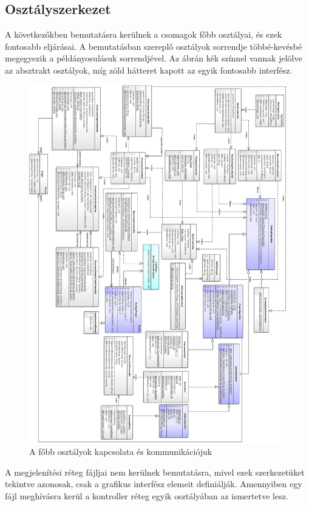 \documentclass{elteikthesis}
\begin{document}
\subsection{Osztályszerkezet}
A következőkben bemutatásra kerülnek a csomagok főbb osztályai, és ezek fontosabb eljárásai. A bemutatásban szereplő osztályok sorrendje többé-kevésbé megegyezik a példányosulásuk sorrendjével. Az ábrán kék színnel vannak jelölve az absztrakt osztályok, míg zöld hátteret kapott az egyik fontosabb interfész.\par
\begin{figure}[H]
	\includegraphics[width=\textwidth, height=0.8\paperheight]{pics/plan_class.png}
	\caption{A főbb osztályok kapcsolata és kommunikációjuk}
\end{figure}
A megjelenítési réteg fájljai nem kerülnek bemutatásra, mivel ezek szerkezetüket tekintve azonosak, csak a grafikus interfész elemeit definiálják. Amennyiben egy fájl meghívásra kerül a kontroller réteg egyik osztályában az ismertetve lesz.
\end{document}
